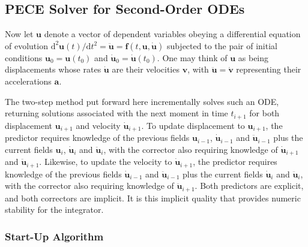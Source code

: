 \subsection{PECE Solver for Second-Order ODEs}
\label{sec:2ndOrderPECE}

Now let $\mathbf{u}$ denote a vector of dependent variables obeying a differential equation of evolution $\mathrm{d}^2 \mathbf{u}(t) / \mathrm{d} t^2 = \ddot{\mathbf{u}} = \mathbf{f} (t, \mathbf{u}, \dot{\mathbf{u}})$ subjected to the pair of initial conditions $\mathbf{u}_0 = \mathbf{u}(t_0)$ and $\dot{\mathbf{u}}_0 = \dot{\mathbf{u}}(t_0)$.  One may think of $\mathbf{u}$ as being displacements whose rates $\dot{\mathbf{u}}$ are their velocities $\mathbf{v}$, with $\ddot{\mathbf{u}} = \dot{\mathbf{v}}$ representing their accelerations $\mathbf{a}$. 

The two-step method put forward here incrementally solves such an ODE, returning solutions associated with the next moment in time $t_{i+1}$ for both displacement $\mathbf{u}_{i+1}$ and velocity $\dot{\mathbf{u}}_{i+1}$.  To update displacement to $\mathbf{u}_{i+1}$, the predictor requires knowledge of the previous fields $\mathbf{u}_{i-1}$, $\dot{\mathbf{u}}_{i-1}$ and $\ddot{\mathbf{u}}_{i-1}$ plus the current fields $\mathbf{u}_i$, $\dot{\mathbf{u}}_i$ and $\ddot{\mathbf{u}}_i$, with the corrector also requiring knowledge of $\dot{\mathbf{u}}_{i+1}$ and $\ddot{\mathbf{u}}_{i+1}$.  Likewise, to update the velocity to $\dot{\mathbf{u}}_{i+1}$, the predictor requires knowledge of the previous fields $\dot{\mathbf{u}}_{i-1}$ and $\ddot{\mathbf{u}}_{i-1}$ plus the current fields $\dot{\mathbf{u}}_i$ and $\ddot{\mathbf{u}}_i$, with the corrector also requiring knowledge of $\ddot{\mathbf{u}}_{i+1}$.  Both predictors are explicit, and both correctors are implicit.  It is this implicit quality that provides numeric stability for the integrator.

\subsubsection{Start-Up Algorithm}

